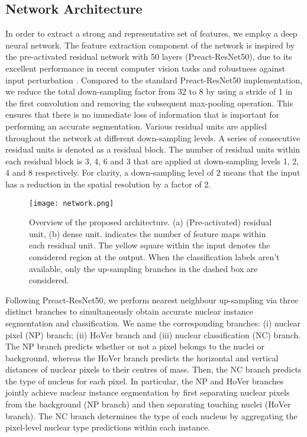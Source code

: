 \documentclass[journal]{IEEEtran}
\begin{document}
	\subsection{Network Architecture} \label{section:networkarchitecture}
    In order to extract a strong and representative set of features, we employ a deep neural network. The feature extraction component of the network is inspired by the pre-activated residual network with 50 layers \cite{preact_resnet} (Preact-ResNet50), due to its excellent performance in recent computer vision tasks \cite{imagenet_cvpr09} and robustness against input perturbation \cite{anurag2018resnet_robustness}. Compared to the standard Preact-ResNet50 implementation, we reduce the total down-sampling factor from 32 to 8 by using a stride of 1 in the first convolution and removing the subsequent max-pooling operation. This ensures that there is no immediate loss of information that is important for performing an accurate segmentation. Various residual units are applied throughout the network at different down-sampling levels. A series of consecutive residual units is denoted as a residual block. The number of residual units within each residual block is 3, 4, 6 and 3 that are applied at down-sampling levels 1, 2, 4 and 8 respectively. For clarity, a down-sampling level of 2 means that the input has a reduction in the spatial resolution by a factor of 2.

	\begin{figure*}[t!]
		\centering
		\texttt{[image: network.png]}
		\caption{Overview of the proposed architecture. (a) (Pre-activated) residual unit, (b) dense unit.  indicates the number of feature maps within each residual unit. The yellow square within the input denotes the considered region at the output. When the classification labels aren't available, only the up-sampling branches in the dashed box are considered.}
		\label{fig:xy_network}
	\end{figure*}
	

    Following Preact-ResNet50, we perform nearest neighbour up-sampling via three distinct branches to simultaneously obtain accurate nuclear instance segmentation and classification. We name the corresponding branches: (i) nuclear pixel (NP) branch; (ii) HoVer branch and (iii) nuclear classification (NC) branch. The NP branch predicts whether or not a pixel belongs to the nuclei or background, whereas the HoVer branch predicts the horizontal and vertical distances of nuclear pixels to their centres of mass. Then, the NC branch predicts the type of nucleus for each pixel. In particular, the NP and HoVer branches jointly achieve nuclear instance segmentation by first separating nuclear pixels from the background (NP branch) and then separating touching nuclei (HoVer branch). The NC branch determines the type of each nucleus by aggregating the pixel-level nuclear type predictions within each instance.
    
\end{document}
